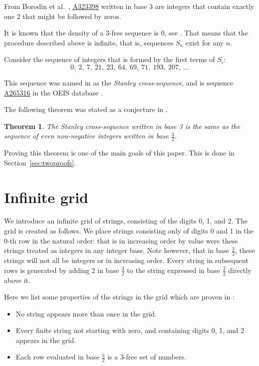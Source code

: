 \documentclass[12pt,reqno]{article}
\theoremstyle{plain}
\newtheorem{theorem}{Theorem}
\theoremstyle{definition}
\theoremstyle{remark}
\newcommand{\seqnum}[1]{\href{https://oeis.org/#1}{\underline{#1}}}
\begin{document}
From Borodin et al.~\cite{PSS}, \seqnum{A323398} written in base 3 are integers that contain exactly one 2 that might be followed by zeros.

It is known that the density of a 3-free sequence is 0, see \cite{Roth}. That means that the procedure described above is infinite, that is, sequences $S_n$ exist for any $n$. 

Consider the  sequence of integers that is formed by the first terms of $S_i$:
\[0,\ 2,\ 7,\ 21,\ 23,\ 64,\ 69,\ 71,\ 193,\ 207,\ \ldots\]

This sequence was named in \cite{PSS} as the \textit{Stanley cross-sequence}, and is sequence \seqnum{A265316} in the OEIS database \cite{OEIS}.

The following theorem was stated as a conjecture in \cite{PSS}.

\begin{theorem}\label{thm:Scs}
The Stanley cross-sequence written in base 3 is the same as the sequence of even non-negative integers written in base $\frac{3}{2}$.
\end{theorem}

Proving this theorem is one of the main goals of this paper. This is done in Section~\ref{sec:twoproofs}.




\section{Infinite grid}\label{sec:grid}

We introduce an infinite grid of strings, consisting of the digits 0, 1, and 2. 
The grid is created as follows. We place strings consisting only of digits 0 and 1 in the 0-th row in the natural order: that is in increasing order by value were these strings treated as integers in any integer base. Note however, that in base $\frac{3}{2}$, these strings will not all be integers or in increasing order. Every string in subsequent rows is generated by adding 2 in base $\frac{3}{2}$ to the string expressed in base $\frac{3}{2}$ directly above it.

Here we list some properties of the strings in the grid which are
proven in \cite{PSS}:

\begin{itemize}
    \item No string appears more than once in the grid.
    \item Every finite string not starting with zero, and containing digits 0, 1, and 2 appears in the grid.
    \item Each row evaluated in base $\frac{3}{2}$ is a 3-free set of numbers.
\end{itemize}
\end{document}
